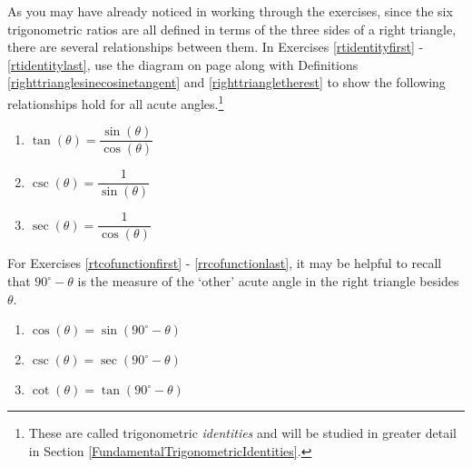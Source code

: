 \documentclass{ximera}
\begin{document}
As you may have already noticed in working through the exercises, since the six trigonometric ratios are all defined in terms of the three sides of a right triangle, there are several relationships between them.  In Exercises \ref{rtidentityfirst} - \ref{rtidentitylast}, use the diagram on page \pageref{righttranglediagram} along with Definitions \ref{righttrianglesinecosinetangent} and \ref{righttriangletherest} to show the following relationships hold for all acute angles.\footnote{These are called trigonometric \textit{identities} and will be studied in greater detail in Section \ref{FundamentalTrigonometricIdentities}.}

\begin{multicols}{3}

\begin{enumerate}

\setcounter{enumi}{\value{HW}}

\item  $\tan(\theta) = \dfrac{\sin(\theta)}{\cos(\theta)}$ \label{rtidentityfirst}

\item  $\csc(\theta) = \dfrac{1}{\sin(\theta)}$

\item  $\sec(\theta) = \dfrac{1}{\cos(\theta)}$

\setcounter{HW}{\value{enumi}}

\end{enumerate}

\end{multicols}

For Exercises \ref{rtcofunctionfirst} - \ref{rrcofunctionlast}, it may be helpful to recall that $90^{\circ} - \theta$ is the measure of the `other' acute angle in the right triangle besides $\theta$.


\begin{multicols}{3}

\begin{enumerate}

\setcounter{enumi}{\value{HW}}

\item  $\cos(\theta) = \sin\left( 90^{\circ} - \theta \right) $ \label{rtcofunctionfirst} \label{cofunctionforeshadowing}

\item  $\csc(\theta) = \sec\left( 90^{\circ} - \theta \right) $

\item  $\cot(\theta) = \tan\left( 90^{\circ} - \theta \right) $ \label{rrcofunctionlast}

\setcounter{HW}{\value{enumi}}

\end{enumerate}

\end{multicols}
\end{document}
